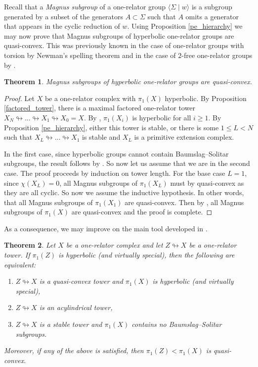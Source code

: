 \documentclass[11pt, a4paper]{amsart}
\newtheorem{theorem}{Theorem}[section]
\theoremstyle{definition}
\def\immerses{\looparrowright}
\begin{document}
Recall that a \emph{Magnus subgroup} of a one-relator group $\langle \Sigma \mid w\rangle$ is a subgroup generated by a subset of the generators $A\subset \Sigma$ such that $A$ omits a generator that appears in the cyclic reduction of $w$. Using Proposition \ref{pe_hierarchy} we may now prove that Magnus subgroups of hyperbolic one-relator groups are quasi-convex. This was previously known in the case of one-relator groups with torsion by Newman's spelling theorem and in the case of $2$-free one-relator groups by \cite[Theorems 8.1 \& 8.2]{me_22}. 

\begin{theorem}
\label{quasiconvex_magnus}
Magnus subgroups of hyperbolic one-relator groups are quasi-convex.
\end{theorem}

\begin{proof}
Let $X$ be a one-relator complex with $\pi_1(X)$ hyperbolic. By Proposition \ref{factored_tower}, there is a maximal factored one-relator tower $X_N\immerses...\immerses X_1\immerses X_0 = X$. By \cite[Corollary 7.8]{gersten_96}, $\pi_1(X_i)$ is hyperbolic for all $i\geq 1$. By Proposition \ref{pe_hierarchy}, either this tower is stable, or there is some $1\leq L<N$ such that $X_L\immerses...\immerses X_1$ is stable and $X_L$ is a primitive extension complex. 

In the first case, since hyperbolic groups cannot contain Baumslag--Solitar subgroups, the result follows by \cite[Theorems 8.1 \& 8.2]{me_22}. So now let us assume that we are in the second case. The proof proceeds by induction on tower length. For the base case $L=1$, since $\chi(X_L) = 0$, all Magnus subgroups of $\pi_1(X_L)$ must by quasi-convex as they are all cyclic. So now we assume the inductive hypothesis. In other words, that all Magnus subgroups of $\pi_1(X_1)$ are quasi-convex. Then by \cite[Theorems 3.6 \& 6.10]{me_22}, all Magnus subgroups of $\pi_1(X)$ are quasi-convex and the proof is complete.
\end{proof}

As a consequence, we may improve on the main tool developed in \cite{me_22}.

\begin{theorem}
\label{main_generalised}
Let $X$ be a one-relator complex and let $Z\immerses X$ be a one-relator tower. If $\pi_1(Z)$ is hyperbolic (and virtually special), then the following are equivalent:
\begin{enumerate}
\item\label{itm:quasiconvex} $Z\immerses X$ is a quasi-convex tower and $\pi_1(X)$ is hyperbolic (and virtually special),
\item\label{itm:acylindrical} $Z\immerses X$ is an acylindrical tower,
\item\label{itm:stable} $Z\immerses X$ is a stable tower and $\pi_1(X)$ contains no Baumslag--Solitar subgroups.
\end{enumerate}
Moreover, if any of the above is satisfied, then $\pi_1(Z)<\pi_1(X)$ is quasi-convex.
\end{theorem}
\end{document}
